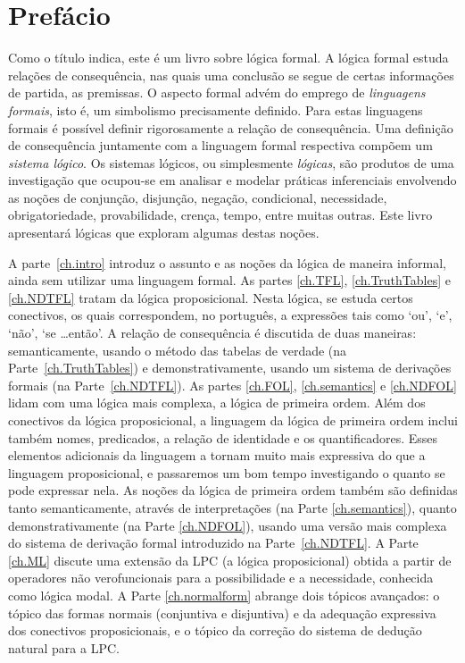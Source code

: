 \chapter{Prefácio}

Como o título indica, este é um livro sobre lógica formal.
A lógica formal estuda relações de consequência, nas quais uma conclusão se segue de certas informações de partida, as premissas.
O aspecto formal advém do emprego de \emph{linguagens formais}, isto é, um simbolismo precisamente definido.
Para estas linguagens formais é possível definir rigorosamente a relação de consequência.
Uma definição de consequência juntamente com a linguagem formal respectiva compõem um \emph{sistema lógico}.
Os sistemas lógicos, ou simplesmente \emph{lógicas}, são produtos de uma investigação que ocupou-se em analisar e modelar práticas inferenciais envolvendo as noções de conjunção, disjunção, negação, condicional, necessidade, obrigatoriedade, provabilidade, crença, tempo, entre muitas outras.
Este livro apresentará lógicas que exploram algumas destas noções.


A parte~\ref{ch.intro} introduz o assunto e as noções da lógica de maneira informal, ainda sem utilizar uma linguagem formal.
As partes \ref{ch.TFL}, \ref{ch.TruthTables} e \ref{ch.NDTFL} tratam da lógica proposicional.  Nesta lógica,  se estuda certos conectivos, os quais correspondem, no português, a expressões tais como `ou', `e', `não', `se \dots então'.
A relação de consequência é discutida de duas maneiras:
semanticamente, usando o método das tabelas de verdade (na Parte~\ref{ch.TruthTables}) e demonstrativamente, usando um sistema de derivações formais (na Parte~\ref{ch.NDTFL}).
As partes \ref{ch.FOL}, \ref{ch.semantics} e \ref{ch.NDFOL} lidam com uma lógica mais complexa, a lógica de primeira ordem.
Além dos conectivos da lógica proposicional, a linguagem da lógica de primeira ordem inclui também nomes, predicados, a relação de identidade e os quantificadores.
Esses elementos adicionais da linguagem a tornam muito mais expressiva do que a linguagem proposicional, e passaremos um bom tempo investigando o quanto se pode expressar nela.
As noções da lógica de primeira ordem também são definidas tanto semanticamente, através de interpretações (na Parte \ref{ch.semantics}), quanto demonstrativamente (na Parte \ref{ch.NDFOL}), usando uma versão mais complexa do sistema de derivação formal introduzido na Parte~\ref{ch.NDTFL}.
A Parte \ref{ch.ML} discute uma extensão da LPC (a lógica proposicional) obtida a partir de operadores não verofuncionais para a possibilidade e a necessidade, conhecida como lógica modal.
A Parte \ref{ch.normalform} abrange dois tópicos avançados:
o tópico das formas normais (conjuntiva e disjuntiva) e da adequação expressiva dos conectivos proposicionais, e o tópico da correção do sistema de dedução natural para a LPC.

